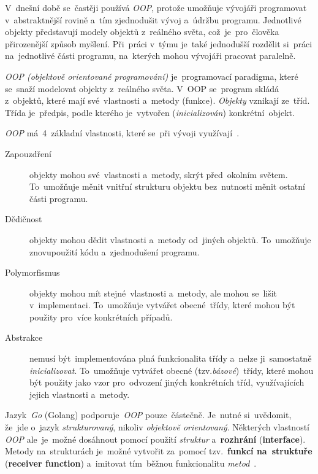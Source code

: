 \documentclass[11pt,a4paper]{report}
\begin{document}
            V~dnešní době se~častěji používá \emph{OOP}, protože umožňuje vývojáři programovat v~abstraktnější rovině a~tím zjednodušit vývoj a~údržbu programu. Jednotlivé objekty představují modely objektů z~reálného světa, což~je~pro~člověka přirozenější způsob myšlení. Při~práci v~týmu je~také jednodušší rozdělit si~práci na~jednotlivé části programu, na~kterých mohou vývojáři pracovat paralelně.
            
            \emph{OOP (objektově orientované programování)} je~programovací paradigma, které se~snaží modelovat objekty z~reálného světa. V~OOP se~program skládá z~objektů, které mají své~vlastnosti a~metody (funkce). \emph{Objekty} vznikají ze~tříd. Třída je~předpis, podle kterého je~vytvořen (\emph{inicializován}) konkrétní~objekt.
            
            \emph{OOP} má~4~základní vlastnosti, které se~při vývoji využívají~\cite{Keogh:OOP}.
            \begin{description}
                \item[Zapouzdření] objekty mohou své~vlastnosti a~metody, skrýt před~okolním světem. To~umožňuje měnit vnitřní strukturu objektu bez~nutnosti měnit ostatní části programu.
                \item[Dědičnost] objekty mohou dědit vlastnosti a~metody od~jiných objektů. To~umožňuje znovupoužití kódu a~zjednodušení programu.
                \item[Polymorfismus] objekty mohou mít stejné~vlastnosti a~metody, ale mohou se~lišit v~implementaci. To~umožňuje vytvářet obecné~třídy, které mohou být použity pro~více konkrétních případů.
                \item[Abstrakce] nemusí být~implementována plná funkcionalita třídy a~nelze ji~samostatně \emph{inicializovat}. To~umožňuje vytvářet obecné (tzv.\emph{bázové})~třídy, které mohou být použity jako vzor pro~odvození jiných konkrétních tříd, využívajících jejich vlastnosti a~metody.
            \end{description}

            Jazyk~\emph{Go} (Golang) podporuje~\emph{OOP} pouze~částečně. Je~nutné si~uvědomit, že~jde o~jazyk \emph{strukturovaný}, nikoliv \emph{objektově orientovaný}. Některých vlastností \emph{OOP} ale~je~možné dosáhnout pomocí použití \emph{struktur} a~\textbf{rozhrání} (\textbf{interface}). Metody na~strukturách je~možné vytvořit za~pomocí tzv.~\textbf{funkcí na~struktuře} (\textbf{receiver function}) a~imitovat tím~běžnou funkcionalitu \emph{metod}~\cite{go:OOP}.
\end{document}

